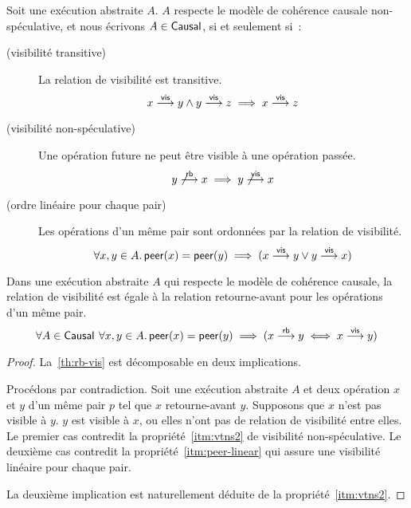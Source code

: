\begin{definition}\label{def:causal-consistency}
  Soit une exécution abstraite $A$. $A$ respecte le modèle de cohérence causale non-spéculative, et nous écrivons $A \in \operatorname{\mathsf{Causal}}$, si et seulement si~:

  \begin{description}
  \item[ (visibilité transitive)]
  La relation de visibilité est transitive.
  \begin{equation*}
    x \overset{\mathsf{vis}}{\longrightarrow} y \land y \overset{\mathsf{vis}}{\longrightarrow} z \implies x \overset{\mathsf{vis}}{\longrightarrow} z
  \end{equation*}

  \item[ (visibilité non-spéculative)]
  Une opération future ne peut être visible à une opération passée.
  \begin{equation*}
    y \not\overset{\mathsf{rb}}{\longrightarrow} x \implies y \not\overset{\mathsf{vis}}{\longrightarrow} x
  \end{equation*}

  \item[ (ordre linéaire pour chaque pair)]
  Les opérations d'un même pair sont ordonnées par la relation de visibilité.
  \begin{equation*}
    \forall x, y \in A \ldotp \operatorname{\mathsf{peer}}(x) = \operatorname{\mathsf{peer}}(y) \implies
    (x \overset{\mathsf{vis}}{\longrightarrow} y \lor y \overset{\mathsf{vis}}{\longrightarrow} x)
  \end{equation*}
  \end{description}
\end{definition}

\begin{proposition}\label{th:rb-vis}
Dans une exécution abstraite $A$ qui respecte le modèle de cohérence causale, la relation de visibilité est égale à la relation retourne-avant pour les opérations d'un même pair.
\begin{equation*}
    \forall A \in \operatorname{\mathsf{Causal}} \:\forall x, y \in A \ldotp \operatorname{\mathsf{peer}}(x) = \operatorname{\mathsf{peer}}(y) \implies (x \overset{\mathsf{rb}}{\longrightarrow} y \iff x \overset{\mathsf{vis}}{\longrightarrow} y)
\end{equation*}
\end{proposition}

\begin{proof}
La~\autoref{th:rb-vis} est décomposable en deux implications.

Procédons par contradiction.
Soit une exécution abstraite $A$ et deux opération $x$ et $y$ d'un même pair $p$ tel que $x$ retourne-avant $y$.
Supposons que $x$ n'est pas visible à $y$.
$y$ est visible à $x$, ou elles n'ont pas de relation de visibilité entre elles.
Le premier cas contredit la propriété~\ref{itm:vtns2} de visibilité non-spéculative.
Le deuxième cas contredit la propriété~\ref{itm:peer-linear} qui assure une visibilité linéaire pour chaque pair.

La deuxième implication est naturellement déduite de la propriété~\ref{itm:vtns2}.
\end{proof}

